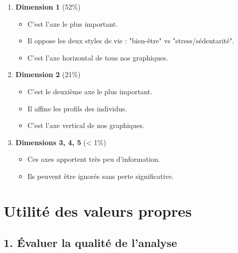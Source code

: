 \documentclass[12pt,a4paper]{book}
\begin{document}
	\begin{enumerate}
		\item \textbf{Dimension 1} (52\%)
		\begin{itemize}
			\item C'est l'axe le plus important.
			\item Il oppose les deux styles de vie : "bien-être" vs "stress/sédentarité".
			\item C'est l'axe horizontal de tous nos graphiques.
		\end{itemize}
		
		\item \textbf{Dimension 2} (21\%)
		\begin{itemize}
			\item C'est le deuxième axe le plus important.
			\item Il affine les profils des individus.
			\item C'est l'axe vertical de nos graphiques.
		\end{itemize}
		
		\item \textbf{Dimensions 3, 4, 5} (< 1\%)
		\begin{itemize}
			\item Ces axes apportent très peu d'information.
			\item Ils peuvent être ignorés sans perte significative.
		\end{itemize}
	\end{enumerate}
	
	\section{Utilité des valeurs propres}
	
	\subsection{1. Évaluer la qualité de l'analyse}
	
	\begin{center}
	\end{center}
	
\end{document}
